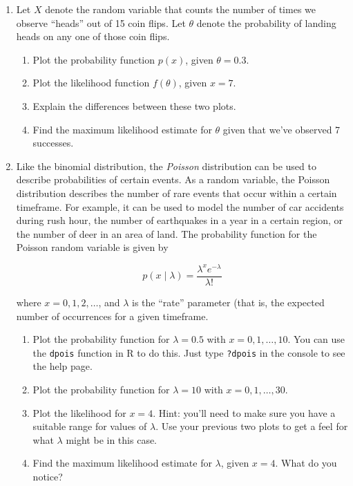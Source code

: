 \documentclass[10pt]{article}
\begin{document}
\begin{enumerate}

\item Let $X$ denote the random variable that counts the number of times we observe ``heads'' out of 15 coin flips.  Let $\theta$ denote the probability of landing heads on any one of those coin flips.

  \begin{enumerate}
  \item Plot the probability function $p(x)$, given $\theta=0.3$.
  \item Plot the likelihood function $f(\theta)$, given $x=7$.
  \item Explain the differences between these two plots.
    \item Find the maximum likelihood estimate for $\theta$ given that we've observed 7 successes.
    \end{enumerate}


  \item Like the binomial distribution, the {\it Poisson} distribution can be used to describe probabilities of certain events.  As a random variable, the Poisson distribution describes the number of rare events that occur within a certain timeframe.  For example, it can be used to model the number of car accidents during rush hour, the number of earthquakes in a year in a certain region, or the number of deer in an area of land.  The probability function for the Poisson random variable is given by

    \[
      p(x\mid \lambda) = \frac{\lambda^xe^{-\lambda}}{\lambda!}
    \]

 where $x=0,1,2,\dots$, and $\lambda$ is the ``rate'' parameter (that is, the expected number of occurrences for a given timeframe.

 \begin{enumerate}
 \item Plot the probability function for $\lambda=0.5$ with $x=0,1,\dots,10$.  You can use the \verb|dpois| function in R to do this.  Just type \verb|?dpois| in the console to see the help page.

 \item Plot the probability function for $\lambda=10$ with $x=0,1,\dots,30$.

 \item Plot the likelihood for $x=4$.  Hint: you'll need to make sure you have a suitable range for values of $\lambda$.  Use your previous two plots to get a feel for what $\lambda$ might be in this case.
   \item Find the maximum likelihood estimate for $\lambda$, given $x=4$.  What do you notice?
   \end{enumerate}


\end{enumerate}
\end{document}
